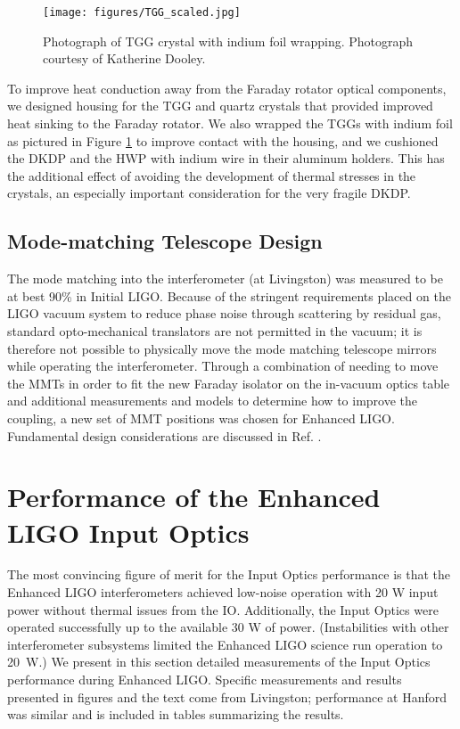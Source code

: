 \begin{figure}
\begin{centering}
\texttt{[image: figures/TGG\_scaled.jpg]}
\caption[Photograph of an indium-wrapped TGG crystal]{Photograph of TGG crystal
  with indium foil wrapping. Photograph courtesy of Katherine Dooley.}
\label{fig:TGG}
\end{centering}
\end{figure}

To improve heat conduction away from the Faraday rotator optical
components, we designed housing for the TGG and quartz crystals that
provided improved heat sinking to the Faraday rotator. We also wrapped
the TGGs with indium foil as pictured in Figure \ref{fig:TGG} to improve
contact with the housing, and we cushioned the DKDP and the HWP with
indium wire in their aluminum holders. This has the additional effect
of avoiding the development of thermal stresses in the crystals, an
especially important consideration for the very fragile DKDP.


\subsection{Mode-matching Telescope Design}
The mode matching into the interferometer (at Livingston) was measured
to be at best 90\% in Initial LIGO. Because of the stringent
requirements placed on the LIGO vacuum system to reduce phase noise
through scattering by residual gas, standard opto-mechanical
translators are not permitted in the vacuum; it is therefore not
possible to physically move the mode matching telescope mirrors while
operating the interferometer. Through a combination of needing to move
the MMTs in order to fit the new Faraday isolator on the in-vacuum
optics table and additional measurements and models to determine how
to improve the coupling, a new set of MMT positions was chosen for
Enhanced LIGO. Fundamental design considerations are discussed in
Ref. \citep{Delker1997Design}.



\section{Performance of the Enhanced LIGO Input Optics}
\label{sec:performance}
The most convincing figure of merit for the Input Optics performance
is that the Enhanced LIGO interferometers achieved low-noise operation
with 20 W input power without thermal issues from the
IO. Additionally, the Input Optics were operated successfully up to
the available 30 W of power.  (Instabilities with other interferometer
subsystems limited the Enhanced LIGO science run operation to 20~W.)
We present in this section detailed measurements of the Input Optics
performance during Enhanced LIGO. Specific measurements and results
presented in figures and the text come from Livingston; performance at
Hanford was similar and is included in tables summarizing the results.



